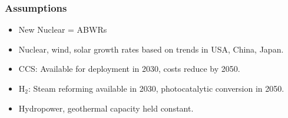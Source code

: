 \begin{frame}
  \frametitle{Assumptions}

  \begin{itemize}
  
  \item New Nuclear = ABWRs
  
  \item Nuclear, wind, solar growth rates based on trends in USA, China, Japan.
  
  \item CCS: Available for deployment in 2030, costs reduce by 2050.
  
  \item H$_2$: Steam reforming available in 2030, photocatalytic conversion in 2050.
  
  \item Hydropower, geothermal capacity held constant.
  
  \end{itemize}

\end{frame}
